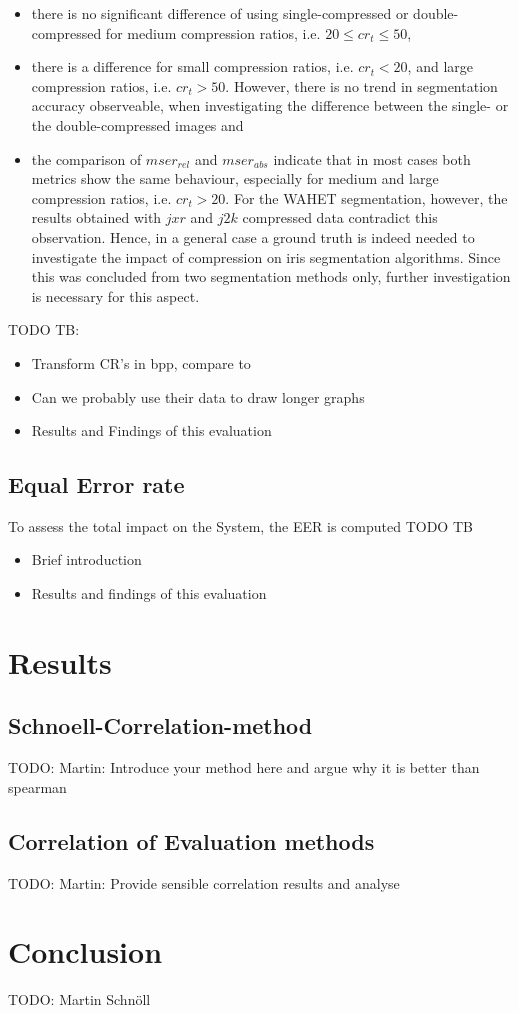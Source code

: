 \documentclass[10pt,twocolumn,letterpaper]{article}
\begin{document}
\begin{itemize}
 \item there is no significant difference of using single-compressed or double-compressed for medium compression ratios, i.e. $ 20 \leq cr_t \leq 50 $,
 \item there is a difference for small compression ratios, i.e. $cr_t < 20$, and large compression ratios, i.e. $cr_t > 50$. However, there is no trend in segmentation accuracy observeable, when investigating the difference between the single- or the double-compressed images and%
 \item the comparison of $mser_{rel}$ and $mser_{abs}$ indicate that in most cases both metrics show the same behaviour, especially for medium and large compression ratios, i.e. $cr_t > 20$. For the WAHET segmentation, however, the results obtained with $jxr$ and $j2k$ compressed data contradict this observation. Hence, in a general case a ground truth is indeed needed to investigate the impact of compression on iris segmentation algorithms. Since this was concluded from two segmentation methods only, further investigation is necessary for this aspect.
\end{itemize}




TODO TB:
\begin{itemize}
 \item Transform CR's in bpp, compare to \cite{severeCompression}
 \item Can we probably use their data to draw longer graphs
 \item Results and Findings of this evaluation
\end{itemize}


\subsection{Equal Error rate}
To assess the total impact on the System, the EER is computed
TODO TB

\begin{itemize}
 \item Brief introduction
 \item Results and findings of this evaluation
\end{itemize}


\section{Results}
\subsection{Schnoell-Correlation-method}
TODO: Martin: Introduce your method here and argue why it is better than spearman

\subsection{Correlation of Evaluation methods}
TODO: Martin:
Provide sensible correlation results and analyse


\section{Conclusion}
TODO: Martin Schnöll


{\small


}
\end{document}
